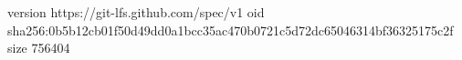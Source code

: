 version https://git-lfs.github.com/spec/v1
oid sha256:0b5b12cb01f50d49dd0a1bcc35ac470b0721c5d72dc65046314bf36325175c2f
size 756404
